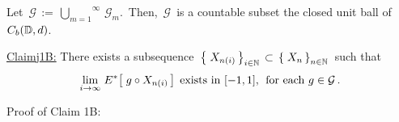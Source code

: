 \vskip 0.3cm
\noindent

\vskip 0.5cm
\noindent
Let \,$\mathcal{G} \,:=\, \overset{\infty}{\underset{m=1}{\bigcup}}\,\mathcal{G}_{m}$.\,
Then, \,$\mathcal{G}$\, is a countable subset the closed unit ball of \,$C_{b}(\mathbb{D},d)$.\,

\vskip 0.8cm
\begin{center}\begin{minipage}{6.5in}
\underline{Claim{{\color{white}j}}1B:}\;\;
There exists a subsequence
\,$\left\{\;X_{n(i)}\,\right\}_{i\in\mathbb{N}} \,\subset\, \left\{\;X_{n}\,\right\}_{n\in\mathbb{N}}$\,
such that %
\begin{equation*}
\underset{i\rightarrow\infty}{\lim}\; E^{*}\!\left[\;g \circ X_{n(i)}\,\right]
\;\textnormal{exists in $[-1,1]$, \;for each $g \in \mathcal{G}$}\,.
\end{equation*}
\end{minipage}\end{center}
Proof of Claim 1B:\;\;

